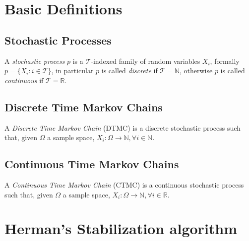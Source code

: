 
\section{Basic Definitions}

\subsection{Stochastic Processes}

A \emph{stochastic process} $p$ is a $\mathcal{T}$-indexed family of
random variables $X_i$, formally $p = \{X_i: i \in \mathcal{T}\}$, in
particular $p$ is called \emph{discrete} if $\mathcal{T} = \mathbb{N}
$, otherwise $p$ is called \emph{continuous} if $\mathcal{T} =
\mathbb{R} $.


\subsection{Discrete Time Markov Chains}

A \emph{Discrete Time Markov Chain} (DTMC) is a discrete stochastic
process such that, given $\Omega$ a sample space, $X_i:\Omega
\rightarrow \mathbb{N}, \forall i\in \mathbb{N} $.

\subsection{Continuous Time Markov Chains}

A \emph{Continuous Time Markov Chain} (CTMC) is a continuous
stochastic process such that, given $\Omega$ a sample space,
$X_i:\Omega \rightarrow \mathbb{N}, \forall i\in \mathbb{R} $.



\section{Herman's Stabilization algorithm}

